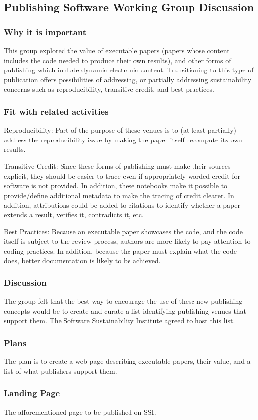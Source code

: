 \subsection{Publishing Software Working Group Discussion} \label{sec:publishing-software}

\subsubsection{Why it is important}

This group explored the value of executable papers (papers whose content includes
the code needed to produce their own results), and other forms of publishing which
include dynamic electronic content. Transitioning to this type of publication offers
possibilities of addressing, or partially addressing sustainability concerns 
such as reproducibility, transitive credit, and best practices.

\subsubsection{Fit with related activities}

Reproducibility: Part of the purpose of these venues is to (at least partially)
address the reproducibility issue by making the paper itself recompute its own
results.

Transitive Credit: Since these forms of publishing must make their sources explicit,
they should be easier to trace even if appropriately worded credit for software
is not provided. In addition, these notebooks make it possible to provide/define
additional metadata to make the tracing of credit clearer. In addition, attributions
could be added to citations to identify whether a paper extends a result, verifies it,
contradicts it, etc.

Best Practices: Because an executable paper showcases the code, and the code itself
is subject to the review process, authors are more likely to pay attention to coding
practices. In addition, because the paper must explain what the code does, better
documentation is likely to be achieved.

\subsubsection{Discussion}

The group felt that the best way to encourage the use of these new publishing
concepts would be to create and curate a list identifying publishing venues
that support them. The Software Sustainability Institute agreed to host this list.

\subsubsection{Plans}

The plan is to create a web page describing executable papers, their value, and
a list of what publishers support them.

\subsubsection{Landing Page}

The afforementioned page to be published on SSI.
